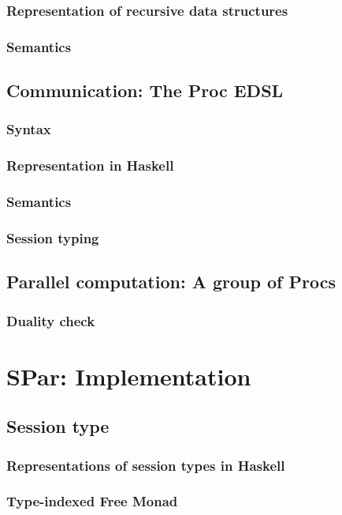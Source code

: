 \documentclass[a4paper, twoside]{report}
\begin{document}
\subsection{Representation of recursive data structures}
\subsection{Semantics}
\section{Communication: The Proc EDSL}
\subsection{Syntax}
\subsection{Representation in Haskell}
\subsection{Semantics}
\subsection{Session typing}
\section{Parallel computation: A group of Procs}
\subsection{Duality check}

\chapter{SPar: Implementation}
\section{Session type}
\subsection{Representations of session types in Haskell}
\subsection{Type-indexed Free Monad}
\end{document}
